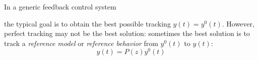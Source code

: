 \begin{remark}
	In a generic feedback control system
    \begin{figure}[H]
        \centering
    \end{figure}

    the typical goal is to obtain the best possible tracking $y(t) = y^0(t)$. However, perfect tracking may not be the best solution: sometimes the best solution is to track a \emph{reference model} or \emph{reference behavior} from $y^0(t)$ to $y(t)$:
    \[
    	y(t) = P(z)y^0(t)
    \]
\end{remark}


